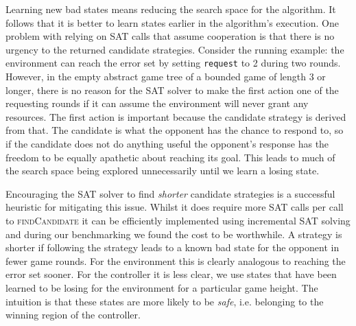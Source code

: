 Learning new bad states means reducing the search space for the algorithm. It follows that it is better to learn states earlier in the algorithm's execution. One problem with relying on SAT calls that assume cooperation is that there is no urgency to the returned candidate strategies. Consider the running example: the environment can reach the error set by setting \texttt{request} to 2 during two rounds. However, in the empty abstract game tree of a bounded game of length 3 or longer, there is no reason for the SAT solver to make the first action one of the requesting rounds if it can assume the environment will never grant any resources. The first action is important because the candidate strategy is derived from that. The candidate is what the opponent has the chance to respond to, so if the candidate does not do anything useful the opponent's response has the freedom to be equally apathetic about reaching its goal. This leads to much of the search space being explored unnecessarily until we learn a losing state.

Encouraging the SAT solver to find \emph{shorter} candidate strategies is a successful heuristic for mitigating this issue. Whilst it does require more SAT calls per call to \textsc{findCandidate} it can be efficiently implemented using incremental SAT solving and during our benchmarking we found the cost to be worthwhile. A strategy is shorter if following the strategy leads to a known bad state for the opponent in fewer game rounds. For the environment this is clearly analogous to reaching the error set sooner. For the controller it is less clear, we use states that have been learned to be losing for the environment for a particular game height. The intuition is that these states are more likely to be \emph{safe}, i.e. belonging to the winning region of the controller.

